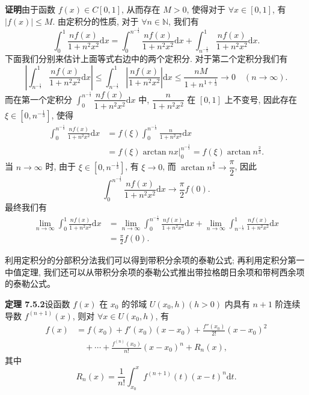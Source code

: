 \documentclass[UTF8, 12pt, fontset=fandol, oneside]{ctexart}
\begin{document}
\noindent\textbf{证明}\quad 由于函数 $f(x)\in C[0,1]$, 从而存在 $M>0$, 使得对于 $\forall x\in[0,1]$, 有 $|f(x)|\leq M$. 由定积分的性质, 对于 $\forall n\in\mathbb N$, 我们有
\[
  \int_0^1\frac{nf(x)}{1+n^2x^2}\mathrm dx
  =\int_0^{n^{-\frac13}}\frac{nf(x)}{1+n^2x^2}\mathrm dx
  +\int_{n^{-\frac13}}^1\frac{nf(x)}{1+n^2x^2}\mathrm dx.
\]
下面我们分别来估计上面等式右边中的两个定积分. 对于第二个定积分我们有
\[
  \left|\int_{n^{-\frac13}}^1\frac{nf(x)}{1+n^2x^2}\mathrm dx\right|
  \leq\int_{n^{-\frac13}}^1\left|\frac{nf(x)}{1+n^2x^2}\right|\mathrm dx
  \leq\frac{nM}{1+n^{1+\frac13}}\to0\quad(n\to\infty).
\]
而在第一个定积分 $\int_0^{n^{-\frac13}}\dfrac{nf(x)}{1+n^2x^2}\mathrm dx$ 中, $\dfrac{n}{1+n^2x^2}$ 在 $[0,1]$ 上不变号, 因此存在 $\xi\in[0,n^{-\frac13}]$, 使得
\[
\begin{aligned}
  \int_0^{n^{-\frac13}}\frac{nf(x)}{1+n^2x^2}\mathrm dx
  &=f(\xi)\int_0^{n^{-\frac13}}\frac{n}{1+n^2x^2}\mathrm dx\\
  &=\left.f(\xi)\arctan nx\right|_0^{n^{-\frac13}}
  =f(\xi)\arctan n^{\frac23}.
\end{aligned}
\]
当 $n\to\infty$ 时, 由于 $\xi\in[0,n^{-\frac13}]$, 有 $\xi\to0$, 而 $\arctan n^{\frac23}\to\dfrac{\pi}{2}$, 因此
\[
  \int_0^{n^{-\frac13}}\frac{nf(x)}{1+n^2x^2}\mathrm dx\to\frac{\pi}{2}f(0).
\]
最终我们有
\[
\begin{aligned}
  \lim_{n\to\infty}\int_0^1\frac{nf(x)}{1+n^2x^2}\mathrm dx
  &=\lim_{n\to\infty}\int_0^{n^{-\frac13}}\frac{nf(x)}{1+n^2x^2}\mathrm dx
  +\lim_{n\to\infty}\int_{n^{-\frac13}}^1\frac{nf(x)}{1+n^2x^2}\mathrm dx\\
  &=\frac{\pi}{2}f(0).
\end{aligned}
\]

利用定积分的分部积分法我们可以得到带积分余项的泰勒公式; 再利用定积分第一中值定理, 我们还可以从带积分余项的泰勒公式推出带拉格朗日余项和带柯西余项的泰勒公式。

\noindent\textbf{定理 7.5.2}\quad 设函数 $f(x)$ 在 $x_0$ 的邻域 $U(x_0,h)(h>0)$ 内具有 $n+1$ 阶连续导数 $f^{(n+1)}(x)$, 则对 $\forall x\in U(x_0,h)$, 有
\begin{equation}
\begin{aligned}
  f(x)&=f(x_0)+f'(x_0)(x-x_0)+\frac{f''(x_0)}{2!}(x-x_0)^2\\
  &\quad+\cdots+\frac{f^{(n)}(x_0)}{n!}(x-x_0)^n+R_n(x),
\end{aligned}
\tag{7.5.1}
\end{equation}
其中
\[
  R_n(x)=\frac{1}{n!}\int_{x_0}^x f^{(n+1)}(t)(x-t)^n\mathrm dt.
\]
\end{document}
